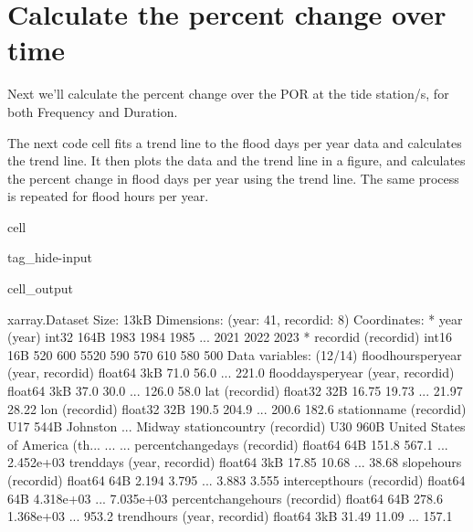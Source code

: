 \documentclass[letterpaper,10pt,english]{jupyterBook}
\begin{document}
\part{Calculate the percent change over time}
\label{\detokenize{notebooks/FloodFrequency:calculate-the-percent-change-over-time}}
\sphinxAtStartPar
Next we’ll calculate the percent change over the POR at the tide station/s, for both Frequency and Duration.

\sphinxAtStartPar
The next code cell fits a trend line to the flood days per year data and calculates the trend line.
It then plots the data and the trend line in a figure, and calculates the percent change in flood days per year using the trend line. The same process is repeated for flood hours per year.

\begin{sphinxuseclass}{cell}
\begin{sphinxuseclass}{tag_hide-input}\begin{sphinxVerbatimOutput}

\begin{sphinxuseclass}{cell_output}
\begin{sphinxVerbatim}[commandchars=\\\{\}]
\PYGZlt{}xarray.Dataset\PYGZgt{} Size: 13kB
Dimensions:               (year: 41, record\PYGZus{}id: 8)
Coordinates:
  * year                  (year) int32 164B 1983 1984 1985 ... 2021 2022 2023
  * record\PYGZus{}id             (record\PYGZus{}id) int16 16B 520 600 5520 590 570 610 580 500
Data variables: (12/14)
    flood\PYGZus{}hours\PYGZus{}per\PYGZus{}year  (year, record\PYGZus{}id) float64 3kB 71.0 56.0 ... 221.0
    flood\PYGZus{}days\PYGZus{}per\PYGZus{}year   (year, record\PYGZus{}id) float64 3kB 37.0 30.0 ... 126.0 58.0
    lat                   (record\PYGZus{}id) float32 32B 16.75 19.73 ... 21.97 28.22
    lon                   (record\PYGZus{}id) float32 32B 190.5 204.9 ... 200.6 182.6
    station\PYGZus{}name          (record\PYGZus{}id) \PYGZlt{}U17 544B \PYGZsq{}Johnston\PYGZsq{} ... \PYGZsq{}Midway\PYGZsq{}
    station\PYGZus{}country       (record\PYGZus{}id) \PYGZlt{}U30 960B \PYGZsq{}United States of America (th...
    ...                    ...
    percent\PYGZus{}change\PYGZus{}days   (record\PYGZus{}id) float64 64B 151.8 567.1 ... 2.452e+03
    trend\PYGZus{}days            (year, record\PYGZus{}id) float64 3kB 17.85 10.68 ... 38.68
    slope\PYGZus{}hours           (record\PYGZus{}id) float64 64B 2.194 3.795 ... 3.883 3.555
    intercept\PYGZus{}hours       (record\PYGZus{}id) float64 64B \PYGZhy{}4.318e+03 ... \PYGZhy{}7.035e+03
    percent\PYGZus{}change\PYGZus{}hours  (record\PYGZus{}id) float64 64B 278.6 1.368e+03 ... 953.2
    trend\PYGZus{}hours           (year, record\PYGZus{}id) float64 3kB 31.49 11.09 ... 157.1
\end{sphinxVerbatim}

\end{sphinxuseclass}\end{sphinxVerbatimOutput}

\end{sphinxuseclass}
\end{sphinxuseclass}
\end{document}
